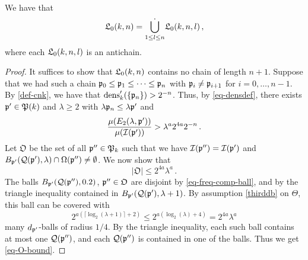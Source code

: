 {\begin{lemma}[L0 antichain]
\label{L0-antichain}
    We have that
    $$
        {\mathfrak L}_0(k,n) = \dot{\bigcup_{1 \le l \le n}} {\mathfrak L}_0(k,n,l)\,,
    $$
    where each ${\mathfrak L}_0(k,n,l)$ is an antichain.
\end{lemma}

\begin{proof}
    It suffices to show that ${\mathfrak L}_0(k,n)$ contains no chain of length $n + 1$. Suppose that we had such a chain ${\mathfrak p}_0 \le {\mathfrak p}_1 \le \dotsb \le {\mathfrak p}_{n}$ with ${\mathfrak p}_i \ne {\mathfrak p}_{i+1}$ for $i  =0, \dotsc, n-1$. By \eqref{def-cnk}, we have that $\operatorname{\operatorname{dens}}_k'(\{{\mathfrak p}_n\}) > 2^{-n}$. Thus, by \eqref{eq-densdef}, there exists ${\mathfrak p}' \in {\mathfrak P}(k)$ and $\lambda \ge 2$ with $\lambda {\mathfrak p}_n \le \lambda {\mathfrak p}'$ and
    \begin{equation}
        \label{eq-p'}
        \frac{\mu(E_2(\lambda, {\mathfrak p}'))}{\mu({\mathcal{I}}({\mathfrak p}'))} > \lambda^{a} 2^{4a} 2^{-n}\,.
    \end{equation}
    Let $\mathfrak{O}$ be the set of all ${\mathfrak p}'' \in {\mathfrak P}_k$ such that we have $ {\mathcal{I}}({\mathfrak p}'') = {\mathcal{I}}({\mathfrak p}')$ and $B_{{\mathfrak p}'}({\mathcal{Q}}({\mathfrak p}'), \lambda) \cap \Omega({\mathfrak p}'') \neq \emptyset$.
    We now show that
    \begin{equation}
        \label{eq-O-bound}
        |\mathfrak{O}| \le 2^{4a}\lambda^a\,.
    \end{equation}
    The balls $B_{{\mathfrak p}'}({\mathcal{Q}}({\mathfrak p}''), 0.2)$, ${\mathfrak p}'' \in \mathfrak{O}$ are disjoint by \eqref{eq-freq-comp-ball}, and by the triangle inequality contained in $B_{{\mathfrak p}'}({\mathcal{Q}}({\mathfrak p}'), \lambda+1)$. By assumption \eqref{thirddb} on $\Theta$, this ball can be covered with
    $$
        2^{a(\lceil \log_2(\lambda+1)\rceil + 2)} \le 2^{a(\log_2(\lambda) + 4)} = 2^{4a}\lambda^a
    $$ many $d_{{\mathfrak p}'}$-balls of radius $1/4$. By the triangle inequality, each such ball contains at most one ${\mathcal{Q}}({\mathfrak p}'')$, and each ${\mathcal{Q}}({\mathfrak p}'')$ is contained in one of the balls. Thus we get \eqref{eq-O-bound}.


\end{proof}}
